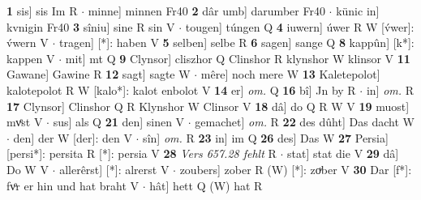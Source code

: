 \documentclass[8pt,a4paper,notitlepage]{article}
\begin{document}
\begin{table}[ht]
\begin{minipage}[t]{0.5\linewidth}
\textbf{1} sis] sis Im R  $\cdot$ minne] minnen Fr40 \textbf{2} dâr umb] darumber Fr40  $\cdot$ künic in] kvnigin Fr40 \textbf{3} sîniu] sine R sin V  $\cdot$ tougen] túngen Q \textbf{4} iuwern] úwer R W [v́wer]: v́wern V  $\cdot$ tragen] [*]: haben V \textbf{5} selben] selbe R \textbf{6} sagen] sange Q \textbf{8} kappûn] [k*]: kappen V  $\cdot$ mit] mt Q \textbf{9} Clynsor] cliszhor Q Clinshor R klynshor W klinsor V \textbf{11} Gawane] Gawine R \textbf{12} sagt] sagte W  $\cdot$ mêre] noch mere W \textbf{13} Kaletepolot] kalotepolot R W [kalo*]: kalot enbolot V \textbf{14} er] \textit{om.} Q \textbf{16} bî] Jn by R  $\cdot$ in] \textit{om.} R \textbf{17} Clynsor] Clinshor Q R Klynshor W Clinsor V \textbf{18} dâ] do Q R W V \textbf{19} muost] mvͤst V  $\cdot$ sus] als Q \textbf{21} den] sinen V  $\cdot$ gemachet] \textit{om.} R \textbf{22} des dûht] Das dacht W  $\cdot$ den] der W [der]: den V  $\cdot$ sîn] \textit{om.} R \textbf{23} in] im Q \textbf{26} des] Das W \textbf{27} Persia] [persi*]: persita R [*]: persia V \textbf{28} \textit{Vers 657.28 fehlt} R   $\cdot$ stat] stat die V \textbf{29} dâ] Do W V  $\cdot$ allerêrst] [*]: alrerst V  $\cdot$ zoubers] zober R (W) [*]: zoͮber  V \textbf{30} Dar [f*]: fvͦr er hin und hat braht V  $\cdot$ hât] hett Q (W) hat R \newline
\end{minipage}
\end{table}
\end{document}
